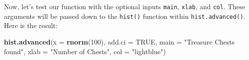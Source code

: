 \documentclass[]{book}
\newenvironment{Shaded}{\begin{snugshade}}{\end{snugshade}}
\newcommand{\KeywordTok}[1]{\textcolor[rgb]{0.13,0.29,0.53}{\textbf{#1}}}
\newcommand{\DataTypeTok}[1]{\textcolor[rgb]{0.13,0.29,0.53}{#1}}
\newcommand{\DecValTok}[1]{\textcolor[rgb]{0.00,0.00,0.81}{#1}}
\newcommand{\StringTok}[1]{\textcolor[rgb]{0.31,0.60,0.02}{#1}}
\newcommand{\CommentTok}[1]{\textcolor[rgb]{0.56,0.35,0.01}{\textit{#1}}}
\newcommand{\OtherTok}[1]{\textcolor[rgb]{0.56,0.35,0.01}{#1}}
\newcommand{\ControlFlowTok}[1]{\textcolor[rgb]{0.13,0.29,0.53}{\textbf{#1}}}
\newcommand{\OperatorTok}[1]{\textcolor[rgb]{0.81,0.36,0.00}{\textbf{#1}}}
\newcommand{\NormalTok}[1]{#1}
\theoremstyle{definition}
\theoremstyle{definition}
\theoremstyle{remark}
\begin{document}
\begin{Shaded}
\end{Shaded}

Now, let's test our function with the optional inputs \texttt{main},
\texttt{xlab}, and \texttt{col}. These arguments will be passed down to
the \texttt{hist()} function within \texttt{hist.advanced()}. Here is
the result:

\begin{Shaded}
\begin{Highlighting}[]
\KeywordTok{hist.advanced}\NormalTok{(}\DataTypeTok{x =} \KeywordTok{rnorm}\NormalTok{(}\DecValTok{100}\NormalTok{), }\DataTypeTok{add.ci =} \OtherTok{TRUE}\NormalTok{,}
              \DataTypeTok{main =} \StringTok{"Treasure Chests found"}\NormalTok{,}
              \DataTypeTok{xlab =} \StringTok{"Number of Chests"}\NormalTok{,}
              \DataTypeTok{col =} \StringTok{"lightblue"}\NormalTok{)}
\end{Highlighting}
\end{Shaded}
\end{document}
